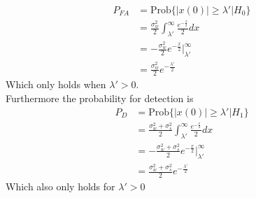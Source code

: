 \begin{align}
    P_{FA} & = \text{Prob}\{|x(0)|\geq\lambda'\vert H_0\}\nonumber\\
    & = \frac{\sigma_w^2}{2}\int_{\lambda'}^{\infty}\frac{e^{-\frac{x}{2}}}{2}dx\nonumber\\
    & = -\frac{\sigma_w^2}{2}e^{-\frac{x}{2}}\bigg\rvert_{\lambda'}^{\infty}\nonumber\\
    & = \frac{\sigma_w^2}{2}e^{-\frac{\lambda'}{2}}\nonumber
\end{align}
Which only holds when $\lambda'>0$.\\
Furthermore the probability for detection is
\begin{align}
    P_D & = \text{Prob}\{|x(0)|\geq\lambda'\vert H_1\}\nonumber\\
    & = \frac{\sigma_w^2+\sigma_s^2}{2}\int_{\lambda'}^{\infty}\frac{e^{-\frac{x}{2}}}{2}dx\nonumber\\
    & = -\frac{\sigma_w^2+\sigma_s^2}{2}e^{-\frac{x}{2}}\bigg\rvert_{\lambda'}^{\infty}\nonumber\\
    & = \frac{\sigma_w^2+\sigma_s^2}{2}e^{-\frac{\lambda'}{2}}\nonumber
\end{align}
Which also only holds for $\lambda'>0$\\

